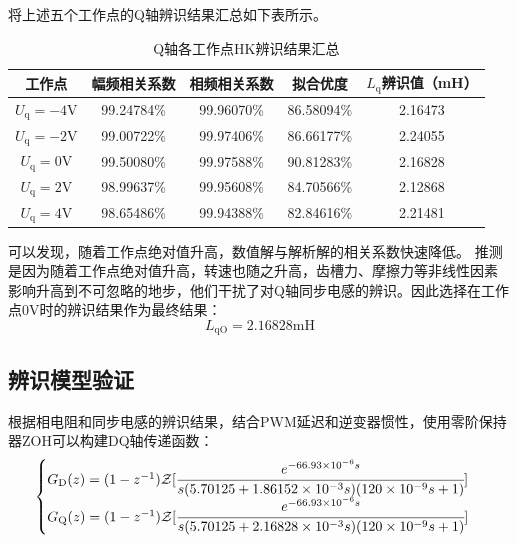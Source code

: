 将上述五个工作点的Q轴辨识结果汇总如下表所示。
\begin{table}[H]
    \centering
    \begin{tabular}{|c|c|c|c|c|}
        \hline
        工作点 & 幅频相关系数 & 相频相关系数 & 拟合优度 & \(L_{\mathrm{q}}\)辨识值（mH）\\
        \hline
        \(U_{\mathrm{q}}=-4\text{V}\)  & 99.24784\% & 99.96070\% & 86.58094\% & 2.16473\\
        \hline
        \(U_{\mathrm{q}}=-2\text{V}\)  & 99.00722\% & 99.97406\% & 86.66177\% & 2.24055\\
        \hline
        \(U_{\mathrm{q}}=0\text{V}\)   & 99.50080\% & 99.97588\% & 90.81283\% & 2.16828\\
        \hline
        \(U_{\mathrm{q}}=2\text{V}\)   & 98.99637\% & 99.95608\% & 84.70566\% & 2.12868\\
        \hline
        \(U_{\mathrm{q}}=4\text{V}\)   & 98.65486\% & 99.94388\% & 82.84616\% & 2.21481\\
        \hline
    \end{tabular}
    \caption{Q轴各工作点HK辨识结果汇总}
    \label{tab:Q轴各工作点辨识结果汇总}
\end{table}

可以发现，随着工作点绝对值升高，数值解与解析解的相关系数快速降低。
推测是因为随着工作点绝对值升高，转速也随之升高，齿槽力、摩擦力等非线性因素
影响升高到不可忽略的地步，他们干扰了对Q轴同步电感的辨识。因此选择在工作点0V时的辨识结果作为最终结果：
\begin{equation*}
    L_{\mathrm{qO}}=2.16828\textrm{mH}
\end{equation*}

\subsection{辨识模型验证}
根据相电阻和同步电感的辨识结果，结合PWM延迟和逆变器惯性，使用零阶保持器ZOH可以构建DQ轴传递函数：
\begin{equation*}
    \begin{cases}
        G_{\mathrm{D}}(z)=(1-z^{-1})\mathcal{Z}[\cfrac{e^{-66.93\times10^{-6}s}}
        {s(5.70125+1.86152\times 10^{-3}s)(120\times 10^{-9}s+1)}]\\
        G_{\mathrm{Q}}(z)=(1-z^{-1})\mathcal{Z}[\cfrac{e^{-66.93\times10^{-6}s}}
        {s(5.70125+2.16828\times 10^{-3}s)(120\times 10^{-9}s+1)}]
    \end{cases}
\end{equation*}


